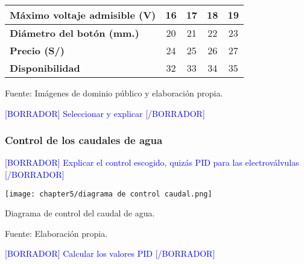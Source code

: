 \begin{mytable}[H]
\begin{tabular}{l|c|c|c|c|}
		\multicolumn{1}{|l|}{
			\begin{minipage}{\myforthmaxsizeofcontenttable}			
				\textbf{Máximo voltaje admisible (V)}
			\end{minipage}
		} &
		16
		& 17         & 18         & 19         \\ \hline
		\multicolumn{1}{|l|}{
			\begin{minipage}{\myforthmaxsizeofcontenttable}			
				\textbf{Diámetro del botón (mm.)}
			\end{minipage}
		} & 20                                                                    & 21         & 22         & 23         \\ \hline
		\multicolumn{1}{|l|}{\textbf{Precio (S/)}}              & 24                                                                    & 25         & 26         & 27         \\ \hline
		\multicolumn{1}{|l|}{\textbf{Disponibilidad}}           & 32                                                                    & 33         & 34         & 35         \\ \hline
	\end{tabular}
	\begin{myflushcenteraftertable}	
		Fuente: Imágenes de dominio público y elaboración propia.
	\end{myflushcenteraftertable}
\end{mytable}

\textcolor{blue}{[BORRADOR] Seleccionar y explicar [/BORRADOR]}

\subsubsection{Control de los caudales de agua}

\textcolor{blue}{[BORRADOR] Explicar el control escogido, quizás PID para las electroválvulas [/BORRADOR]}

\begin{myfigure}[H]
	\footnotesize\centering
	\texttt{[image: chapter5/diagrama de control caudal.png]}
	\caption{Diagrama de control del caudal de agua.}
	\begin{myflushcenter}
		Fuente: Elaboración propia.
	\end{myflushcenter}
	\label{fig:diagrama de control caudal}
\end{myfigure}

\textcolor{blue}{[BORRADOR] Calcular los valores PID [/BORRADOR]}

